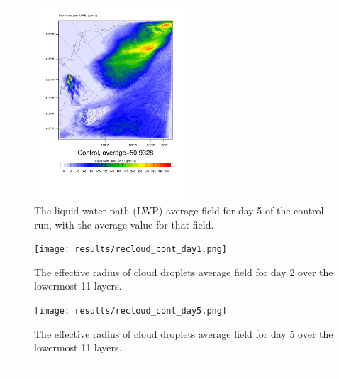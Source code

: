 \begin{figure}[h]
\centering
\includegraphics[width=0.5\textwidth]{results/LWP_Day5.pdf}
\caption{The liquid water path (LWP) average field for day 5 of the control run, with the average value for that field.}
\label{fig:LWPr1Day5}
\end{figure}


\begin{figure}[h]
\centering
\texttt{[image: results/recloud\_cont\_day1.png]}
\caption{The effective radius of cloud droplets average field for day 2 over the lowermost 11 layers.}
\label{fig:recloud_r1Day1}
\end{figure}

\begin{figure}[h]
\centering
\texttt{[image: results/recloud\_cont\_day5.png]}
\caption{The effective radius of cloud droplets average field for day 5 over the lowermost 11 layers.}
\label{fig:recloud_r1Day5}
\end{figure}


---------


